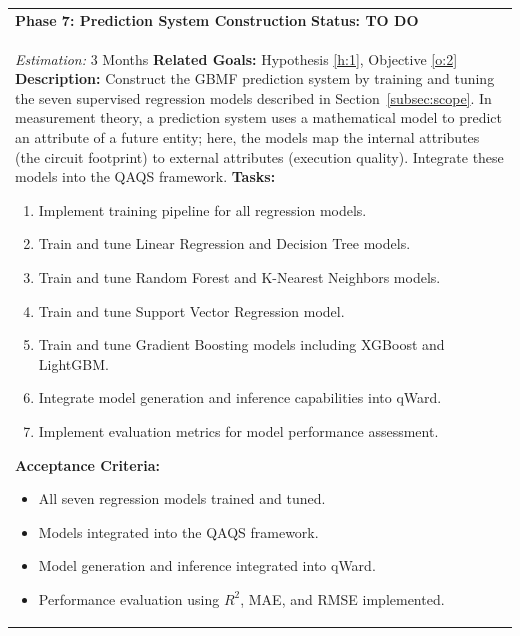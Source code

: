 \documentclass{article}
\begin{document}
\begin{longtable}{@{}p{\textwidth}@{}}
    \textbf{Phase 7: Prediction System Construction} \label{p:7} \hfill \textbf{Status: TO DO} \\
    \textit{Estimation:} 3 Months \newline
    \textbf{Related Goals:} Hypothesis \ref{h:1}, Objective \ref{o:2} \newline
    \textbf{Description:} Construct the GBMF prediction system by training and tuning the seven supervised regression models described in Section~\ref{subsec:scope}. In measurement theory, a prediction system uses a mathematical model to predict an attribute of a future entity; here, the models map the internal attributes (the circuit footprint) to external attributes (execution quality). Integrate these models into the QAQS framework. \newline
    \textbf{Tasks:}
    \begin{enumerate}[label=T7.\arabic*, ref=T7.\arabic*, font=\bfseries, leftmargin=3.5em, labelindent=0pt, itemindent=0pt, labelsep=0.5em, noitemsep, topsep=0pt]
        \item \label{p7:t1} Implement training pipeline for all regression models.
        \item \label{p7:t2} Train and tune Linear Regression and Decision Tree models.
        \item \label{p7:t3} Train and tune Random Forest and K-Nearest Neighbors models.
        \item \label{p7:t4} Train and tune Support Vector Regression model.
        \item \label{p7:t5} Train and tune Gradient Boosting models including XGBoost and LightGBM.
        \item \label{p7:t6} Integrate model generation and inference capabilities into qWard.
        \item \label{p7:t7} Implement evaluation metrics for model performance assessment.
    \end{enumerate}
    \textbf{Acceptance Criteria:}
    \begin{itemize}[leftmargin=1.5em, labelindent=0pt, itemindent=0pt, noitemsep, topsep=0pt]
        \item All seven regression models trained and tuned.
        \item Models integrated into the QAQS framework.
        \item Model generation and inference integrated into qWard.
        \item Performance evaluation using $R^2$, MAE, and RMSE implemented.
    \end{itemize} \\
    \midrule
    

\end{longtable}
\end{document}
